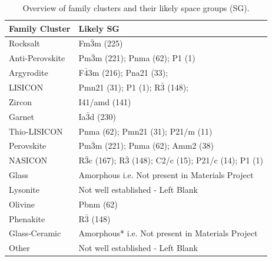\documentclass[a4paper,fleqn]{cas-sc}
\begin{document}
\begin{table}[htbp]
    \centering
    \caption{Overview of family clusters and their likely space groups (SG).}
    \label{tab:family_clusters_sg}
    \begin{tabular}{ll}
        \hline
        \textbf{Family Cluster} & \textbf{Likely SG} \\
        \hline
        Rocksalt          & Fm$\bar{3}$m (225) \\
        Anti-Perovskite   & Pm$\bar{3}$m (221); Pnma (62); P1 (1) \\
        Argyrodite        & F$\bar{4}$3m (216); Pna21 (33); \\
        LISICON           & Pmn21 (31); P1 (1); R$\bar{3}$ (148); \\
        Zircon            & I41/amd (141) \\
        Garnet            & Ia$\bar{3}$d (230) \\
        Thio-LISICON      & Pnma (62); Pmn21 (31); P21/m (11) \\
        Perovskite        & Pm$\bar{3}$m (221); Pnma (62); Amm2 (38) \\
        NASICON           & R$\bar{3}$c (167); R$\bar{3}$ (148); C2/c (15); P21/c (14); P1 (1) \\
        Glass             & Amorphous i.e. Not present in Materials Project\\
        Lysonite          & Not well established - Left Blank \\
        Olivine           & Pbnm (62) \\
        Phenakite         & R$\bar{3}$ (148) \\
        Glass-Ceramic     & Amorphous* i.e. Not present in Materials Project\\
        Other             & Not well established - Left Blank\\
        \hline
    \end{tabular}
\end{table}
\end{document}
